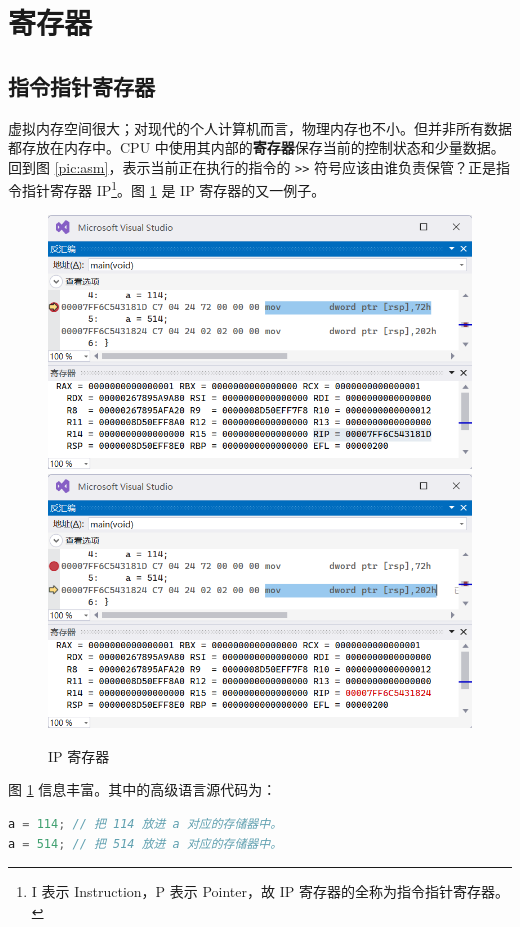 
\section{寄存器}

\subsection{指令指针寄存器}

虚拟内存空间很大；对现代的个人计算机而言，物理内存也不小。但并非所有数据都存放在内存中。CPU 中使用其内部的\textbf{寄存器}保存当前的控制状态和少量数据。回到图 \ref{pic:asm}，表示当前正在执行的指令的 \lstinline{>>} 符号应该由谁负责保管？正是指令指针寄存器 IP\footnote{I 表示 Instruction，P 表示 Pointer，故 IP 寄存器的全称为指令指针寄存器。}。图 \ref{pic:ip} 是 IP 寄存器的又一例子。

\begin{figure}[H]
	\centering
	\includegraphics[width=0.7\linewidth]{pic/ip-1.png}
	\includegraphics[width=0.7\linewidth]{pic/ip-2.png}
	\caption{IP 寄存器}
	\label{pic:ip}
\end{figure}

图 \ref{pic:ip} 信息丰富。其中的高级语言源代码为：

\begin{lstlisting}[language=c++, numbers=none]
a = 114; // 把 114 放进 a 对应的存储器中。
a = 514; // 把 514 放进 a 对应的存储器中。
\end{lstlisting}

